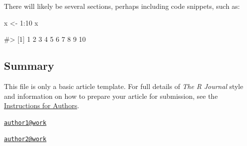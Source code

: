 There will likely be several sections, perhaps including code snippets,
such as:

\begin{Schunk}
\begin{Sinput}
x <- 1:10
x
\end{Sinput}
\begin{Soutput}
#>  [1]  1  2  3  4  5  6  7  8  9 10
\end{Soutput}
\end{Schunk}

\subsection{Summary}\label{summary}

This file is only a basic article template. For full details of
\emph{The R Journal} style and information on how to prepare your
article for submission, see the
\href{https://journal.r-project.org/share/author-guide.pdf}{Instructions
for Authors}. 

\address{%
Author One\\
Affiliation\\
line 1\\ line 2\\
}
\href{mailto:author1@work}{\nolinkurl{author1@work}}

\address{%
Author Two\\
Affiliation\\
line 1\\ line 2\\
}
\href{mailto:author2@work}{\nolinkurl{author2@work}}

